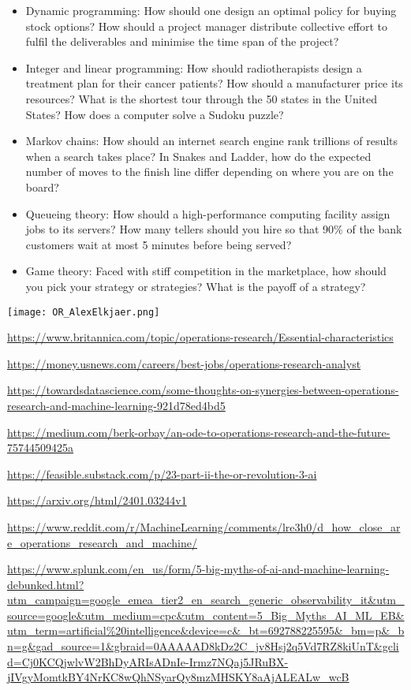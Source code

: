 \begin{itemize}
  \item Dynamic programming: How should one design an optimal policy for buying stock options? How should a project manager distribute collective effort to fulfil the deliverables and minimise the time span of the project?
  \item Integer and linear programming: How should radiotherapists design a treatment plan for their cancer patients? How should a manufacturer price its resources? What is the shortest tour through the 50 states in the United States? How does a computer solve a Sudoku puzzle?
  \item Markov chains: How should an internet search engine rank trillions of results when a search takes place? In Snakes and Ladder, how do the expected number of moves to the finish line differ depending on where you are on the board?
  \item Queueing theory: How should a high-performance computing facility assign jobs to its servers? How many tellers should you hire so that 90\% of the bank customers wait at most 5 minutes before being served?
  \item Game theory: Faced with stiff competition in the marketplace, how should you pick your strategy or strategies? What is the payoff of a strategy?
\end{itemize}


\begin{center}
  \texttt{[image: OR\_AlexElkjaer.png]}
\end{center}


\url{https://www.britannica.com/topic/operations-research/Essential-characteristics}

\url{https://money.usnews.com/careers/best-jobs/operations-research-analyst}

\url{https://towardsdatascience.com/some-thoughts-on-synergies-between-operations-research-and-machine-learning-921d78ed4bd5}

\url{https://medium.com/berk-orbay/an-ode-to-operations-research-and-the-future-75744509425a}

\url{https://feasible.substack.com/p/23-part-ii-the-or-revolution-3-ai}

\url{https://arxiv.org/html/2401.03244v1}

\url{https://www.reddit.com/r/MachineLearning/comments/lre3h0/d_how_close_are_operations_research_and_machine/}

\url{https://www.splunk.com/en_us/form/5-big-myths-of-ai-and-machine-learning-debunked.html?utm_campaign=google_emea_tier2_en_search_generic_observability_it&utm_source=google&utm_medium=cpc&utm_content=5_Big_Myths_AI_ML_EB&utm_term=artificial%20intelligence&device=c&_bt=692788225595&_bm=p&_bn=g&gad_source=1&gbraid=0AAAAAD8kDz2C_jv8Hsj2q5Vd7RZ8kiUnT&gclid=Cj0KCQjwlvW2BhDyARIsADnIe-Irmz7NQaj5JRuBX-jIVgyMomtkBY4NrKC8wQhNSyarQy8mzMHSKY8aAjALEALw_wcB}

